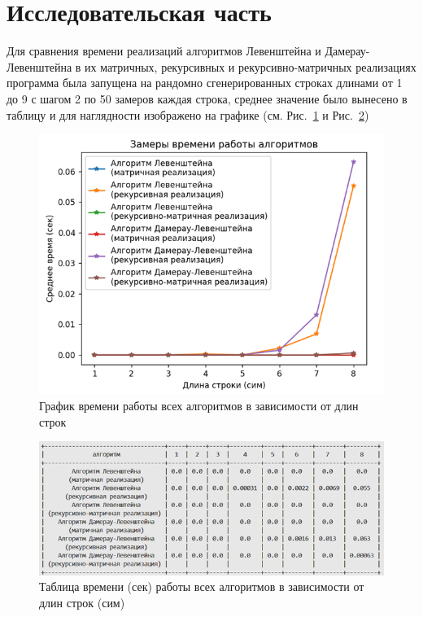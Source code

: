 \section{Исследовательская часть}

\hspace{1.25cm}
Для сравнения времени реализаций алгоритмов Левенштейна и Дамерау-Левенштейна в их матричных, рекурсивных и рекурсивно-матричных реализациях программа была запущена на рандомно сгенерированных строках длинами от 1 до 9 с шагом 2 по 50 замеров каждая строка, среднее значение было вынесено в таблицу и для наглядности изображено на графике (см. Рис.~\ref{fig:graph_all} и Рис.~\ref{fig:table_all})

\begin{figure}[H]
    \centering
    \includegraphics[width=1\textwidth]{img/graph_all.png}
    \caption{График времени работы всех алгоритмов в зависимости от длин строк}
    \label{fig:graph_all} %
\end{figure}

\begin{figure}[H]
    \centering
    \includegraphics[width=1\textwidth]{img/table_all.png}
    \caption{Таблица времени (сек) работы всех алгоритмов в зависимости от длин строк (сим)}
    \label{fig:table_all}
\end{figure}

